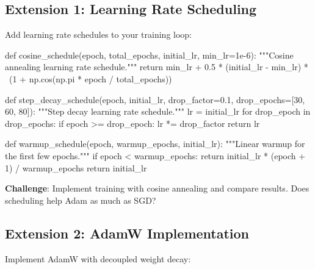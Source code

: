 \documentclass[../../main.tex]{subfiles}
\begin{document}
\subsection{Extension 1: Learning Rate Scheduling}

Add learning rate schedules to your training loop:

\begin{pythoncode}
def cosine_schedule(epoch, total_epochs, initial_lr, min_lr=1e-6):
    """Cosine annealing learning rate schedule."""
    return min_lr + 0.5 * (initial_lr - min_lr) * \
           (1 + np.cos(np.pi * epoch / total_epochs))

def step_decay_schedule(epoch, initial_lr, drop_factor=0.1,
                        drop_epochs=[30, 60, 80]):
    """Step decay learning rate schedule."""
    lr = initial_lr
    for drop_epoch in drop_epochs:
        if epoch >= drop_epoch:
            lr *= drop_factor
    return lr

def warmup_schedule(epoch, warmup_epochs, initial_lr):
    """Linear warmup for the first few epochs."""
    if epoch < warmup_epochs:
        return initial_lr * (epoch + 1) / warmup_epochs
    return initial_lr
\end{pythoncode}

\textbf{Challenge}: Implement training with cosine annealing and compare results. Does scheduling help Adam as much as SGD?

\subsection{Extension 2: AdamW Implementation}

Implement AdamW with decoupled weight decay:
\end{document}
